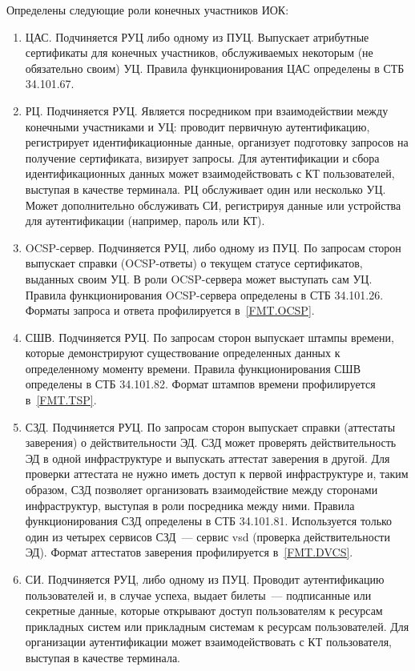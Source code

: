 Определены следующие роли конечных участников ИОК:
\begin{enumerate}
\item
ЦАС. Подчиняется РУЦ либо одному из ПУЦ. 
Выпускает атрибутные сертификаты для 
конечных участников, обслуживаемых некоторым (не обязательно своим) УЦ.
Правила функционирования ЦАС определены в СТБ 34.101.67.

\item
РЦ. Подчиняется РУЦ.
Является посредником при взаимодействии между конечными участниками и УЦ:
проводит первичную аутентификацию, регистрирует идентификационные данные,
организует подготовку запросов на получение сертификата, визирует запросы. 
%
Для аутентификации и сбора идентификационных данных может 
взаимодействовать с КТ пользователей, выступая в качестве терминала. 
%  
РЦ обслуживает один или несколько УЦ. Может дополнительно 
обслуживать СИ, регистрируя данные или устройства для аутентификации 
(например, пароль или КТ). 

\item
OCSP-сервер. Подчиняется РУЦ, либо одному из ПУЦ.
По запросам сторон выпускает справки (OCSP-ответы)
о текущем статусе сертификатов, выданных своим УЦ. 
В роли OCSP-сервера может выступать сам УЦ.
Правила функционирования OCSP-сервера определены в СТБ 34.101.26.
%
Форматы запроса и ответа профилируется в~\ref{FMT.OCSP}.

\item
СШВ. Подчиняется РУЦ.
По запросам сторон выпускает штампы времени, которые демонстрируют 
существование определенных данных к определенному моменту времени. 
Правила функционирования СШВ определены в СТБ 34.101.82.
%
Формат штампов времени профилируется в~\ref{FMT.TSP}.

\item
СЗД. Подчиняется РУЦ.
По запросам сторон выпускает справки (аттестаты заверения)
о действительности ЭД. 
%
СЗД может проверять действительность ЭД в одной инфраструктуре и 
выпускать аттестат заверения в другой. Для проверки аттестата не нужно 
иметь доступ к первой инфраструктуре и, таким образом, СЗД позволяет 
организовать взаимодействие между сторонами инфраструктур, выступая в роли 
посредника между ними. 
%
Правила функционирования СЗД определены в СТБ 34.101.81.
Используется только один из четырех сервисов СЗД~---
сервис vsd (проверка действительности ЭД).
%
Формат аттестатов заверения профилируется в~\ref{FMT.DVCS}.

\item
СИ. Подчиняется РУЦ, либо одному из ПУЦ.
Проводит аутентификацию пользователей и, в случае успеха, выдает билеты~---
подписанные или секретные данные, которые открывают доступ пользователям к 
ресурсам прикладных систем или прикладным системам к ресурсам пользователей.
Для организации аутентификации может взаимодействовать с КТ пользователя,
выступая в качестве терминала.


\end{enumerate}
